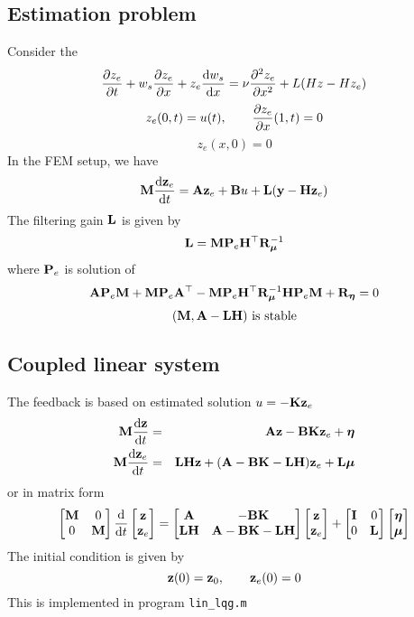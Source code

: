\documentclass[12pt]{article}
\begin{document}

\subsection{Estimation problem}
Consider the 
\begin{equation}
\df{z_e}{t} + w_s \df{z_e}{x} + z_e \dd{w_s}{x} = \nu \df{^2 z_e}{x^2} + L( H z - H z_e )
\end{equation}
\begin{equation}
z_e(0,t) = u(t), \qquad \df{z_e}{x}(1,t) = 0
\end{equation}
\begin{equation}
z_e(x,0) = 0
\end{equation}
In the FEM setup, we have
\[
\M \dd{\z_e}{t} = \A \z_e + \B u + \bL(\y - \bH \z_e)
\]
The filtering gain $\bL$ is given by 
\[
\bL = \M \bdP_e \bH^\top \R^{-1}_{\boldsymbol\mu}
\]
where $\bdP_e$ is solution of
\[
\A \bdP_e \M + \M \bdP_e \A^\top - \M \bdP_e \bH^\top \R_{\boldsymbol\mu}^{-1}  \bH \bdP_e \M + \R_{\boldsymbol\eta}  = 0
\]
\[
 (\M,\A - \bL \bH) \text{ is stable} 
\]


\subsection{Coupled linear system}
The feedback is based on estimated solution $u = -\K \z_e$
\begin{eqnarray*}
\M \dd{\z}{t} &=& \A \z - \B \K \z_e + \boldsymbol\eta \\
\M \dd{\z_e}{t} &=& \bL \bH \z + (\A - \B \K - \bL \bH) \z_e + \bL \boldsymbol\mu
\end{eqnarray*}
or in matrix form
\[\begin{bmatrix}
   \M & 0\\
   0 & \M \\
  \end{bmatrix}
\dd{}{t} \begin{bmatrix}
\z \\
\z_e \end{bmatrix} = \begin{bmatrix}
\A & -\B \K \\
\bL \bH & \A - \B \K - \bL \bH \end{bmatrix} \begin{bmatrix}
\z \\ \z_e \end{bmatrix} + \begin{bmatrix}
\I & 0 \\
0 & \bL \end{bmatrix} \begin{bmatrix}
\boldsymbol\eta \\ \boldsymbol\mu \end{bmatrix}
\]
The initial condition is given by
\[
\z(0) = \z_0, \qquad \z_e(0) = 0
\]
This is implemented in program {\tt lin\_lqg.m}
\end{document}
